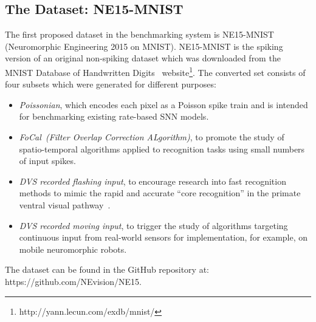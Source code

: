 \documentclass{frontiersENG} %
\begin{document}
\subsection{The Dataset: NE15-MNIST}
\label{sec:data}
The first proposed dataset in the benchmarking system is NE15-MNIST (Neuromorphic Engineering 2015 on MNIST).
NE15-MNIST is the spiking version of an original non-spiking dataset which was downloaded from the MNIST Database of Handwritten Digits~\citep{lecun1998gradient}  website\footnote{http://yann.lecun.com/exdb/mnist/}. The converted set consists of four subsets which were generated for different purposes:
\begin{itemize}
	\item \textit{Poissonian},
	which encodes each pixel as a Poisson spike train and is intended for benchmarking existing rate-based SNN models.
	\item \textit{FoCal~(Filter Overlap Correction ALgorithm)},
	to promote the study of spatio-temporal algorithms applied to recognition tasks using small numbers of input spikes.
	\item \textit{DVS recorded flashing input},
	to encourage research into fast recognition methods to mimic the rapid and accurate ``core recognition'' in the primate ventral visual pathway~\citep{dicarlo2012does}.
	\item \textit{DVS recorded moving input},
	to trigger the study of algorithms targeting continuous input from real-world sensors for implementation, for example, on mobile neuromorphic robots.
\end{itemize}
The dataset can be found in the GitHub repository at: https://github.com/NEvision/NE15.
\end{document}
